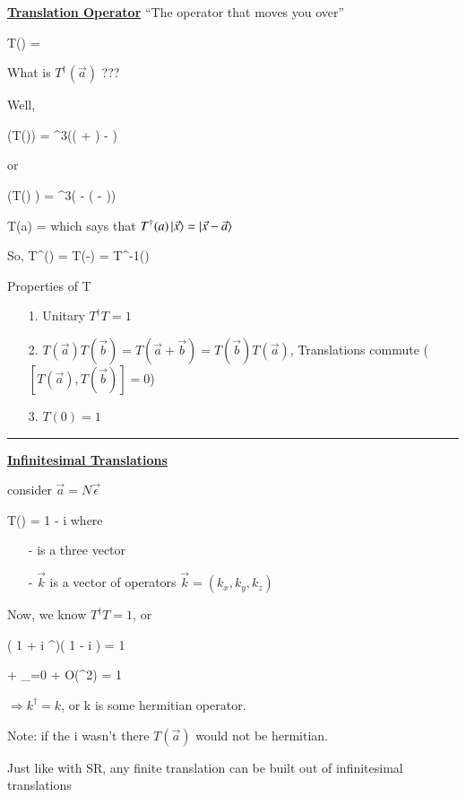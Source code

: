 {\textbf{\underline{Translation Operator}}
``The operator that moves you over''

\be
T() \ketX = 
\ee


What is $T^\dagger(\vec{a})$ ???

Well, 

\be
{}\left(T()\ketX \right) = \delta^3(( + ) - )
\ee

or 

\be
\left(T() \right) \ketX  = \delta^3( - ( - ))
\ee

\be
\Rightarrow {}T(a) = 
\ee
which says that $T^\dagger(a)\ket{\vec{x}} = \ket{\vec{x}-\vec{a}}$

So, 
\be
T^\dagger() = T(-) = T^{-1}()
\ee

Properties of T
\begin{itemize}
\item[1.] Unitary $T^\dagger T = 1$
\item[2.] $T(\vec{a})T(\vec{b}) = T(\vec{a} + \vec{b}) = T(\vec{b})T(\vec{a})$,  Translations commute ($[T(\vec{a}),T(\vec{b})] = 0$)
\item[3.] $T(0) = 1$
\end{itemize}


\noindent\rule{\textwidth}{1pt}

\textbf{\underline{Infinitesimal Translations}}

consider $\vec{a} = N\vec{\epsilon}$



\be
T(\ve) = 1 - i \ve \cdot {}
\ee 
where 
\begin{itemize}
\item[-]\ve is a three vector
\item[-]$\vec{k}$ is a vector of operators $\vec{k} = (k_x, k_y, k_z)$
\end{itemize}

Now, we know $T^\dagger T = 1$, or 

\be
\left( 1 + i \ve \cdot {}^\dagger \right)\left( 1 - i \ve \cdot {} \right) = 1
\ee

 + _{=0} + O(\epsilon^2) = 1
\ee

$\Rightarrow k^\dagger = k$, or k is some hermitian operator.


Note: if the i wasn't there $T(\vec{a})$ would not be hermitian. 

Just like with SR, any finite translation can be built out of infinitesimal translations

}
